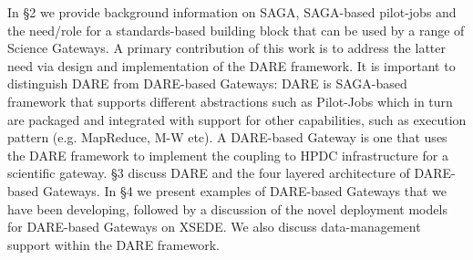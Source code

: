 \documentclass[]{svjour3}
\begin{document}
In \S2 we provide background information on SAGA, SAGA-based
pilot-jobs and the need/role for a standards-based building block that
can be used by a range of Science Gateways.  A primary contribution of
this work is to address the latter need via design and implementation
of the DARE framework.  It is important to distinguish DARE from
DARE-based Gateways: DARE is SAGA-based framework that supports
different abstractions such as Pilot-Jobs which in turn are packaged
and integrated with support for other capabilities, such as execution
pattern (e.g. MapReduce, M-W etc). A DARE-based Gateway is one that
uses the DARE framework to implement the coupling to HPDC
infrastructure for a scientific gateway.  \S3 discuss DARE and the
four layered architecture of DARE-based Gateways. In \S4 we present examples of DARE-based Gateways that we have been developing, followed by a discussion of the novel
deployment models for DARE-based Gateways on XSEDE. We also discuss
data-management support within the DARE framework.


\end{document}
